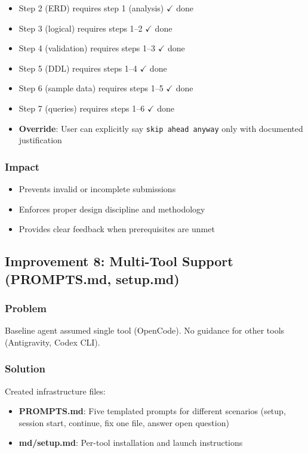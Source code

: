 \documentclass[12pt,a4paper]{article}
\begin{document}
\begin{itemize}
    \item Step 2 (ERD) requires step 1 (analysis) $\checkmark$ done
    \item Step 3 (logical) requires steps 1--2 $\checkmark$ done
    \item Step 4 (validation) requires steps 1--3 $\checkmark$ done
    \item Step 5 (DDL) requires steps 1--4 $\checkmark$ done
    \item Step 6 (sample data) requires steps 1--5 $\checkmark$ done
    \item Step 7 (queries) requires steps 1--6 $\checkmark$ done
    \item \textbf{Override}: User can explicitly say \texttt{skip ahead anyway} only with documented justification
\end{itemize}

\subsubsection{Impact}
\begin{itemize}
    \item Prevents invalid or incomplete submissions
    \item Enforces proper design discipline and methodology
    \item Provides clear feedback when prerequisites are unmet
\end{itemize}

\subsection{Improvement 8: Multi-Tool Support (PROMPTS.md, setup.md)}

\subsubsection{Problem}
Baseline agent assumed single tool (OpenCode). No guidance for other tools (Antigravity, Codex CLI).

\subsubsection{Solution}
Created infrastructure files:

\begin{itemize}
    \item \textbf{PROMPTS.md}: Five templated prompts for different scenarios (setup, session start, continue, fix one file, answer open question)
    \item \textbf{md/setup.md}: Per-tool installation and launch instructions
\end{itemize}
\end{document}
